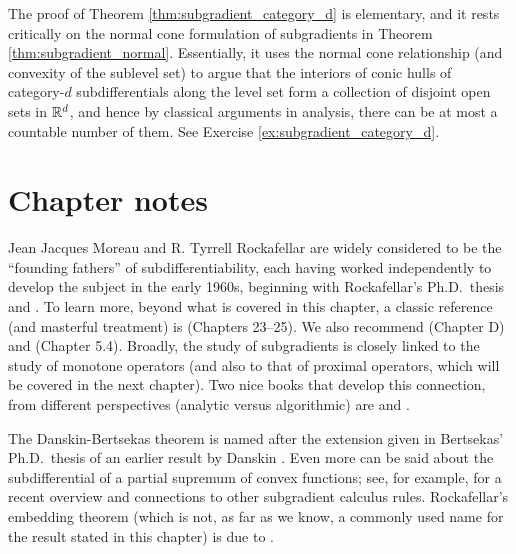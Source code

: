 
The proof of Theorem \ref{thm:subgradient_category_d} is elementary, and it
rests critically on the normal cone formulation of subgradients in Theorem 
\ref{thm:subgradient_normal}. Essentially, it uses the normal cone relationship
(and convexity of the sublevel set) to argue that the interiors of 
conic hulls of category-$d$ subdifferentials along the level set form a
collection of disjoint open sets in $\mathbb{R}^d$, and hence by classical arguments in 
analysis, there can be at most a countable number of them. See Exercise
\ref{ex:subgradient_category_d}.   

\SkipTocEntry\section*{Chapter notes}

Jean Jacques Moreau and R. Tyrrell Rockafellar are widely considered to be the
``founding fathers'' of subdifferentiability, each having worked independently
to develop the subject in the early 1960s, beginning with Rockafellar's Ph.D.\
thesis \cite{rockafellar1963convex} and \cite{moreau1963inf,
  moreau1963proprietes}. To learn more, beyond what is covered in this chapter,
a classic reference (and masterful treatment) is \cite{rockafellar1970convex}
(Chapters 23--25). We also recommend \cite{hiriartUrruty2001fundamentals}
(Chapter D) and \cite{bertsekas2009convex} (Chapter 5.4). Broadly, the study of
subgradients is closely linked to the study of monotone operators (and also to 
that of proximal operators, which will be covered in the next chapter). Two nice
books that develop this connection, from different perspectives (analytic versus 
algorithmic) are \cite{bauschke2011convex} and \cite{ryu2022large}.

The Danskin-Bertsekas theorem is named after the extension given in Bertsekas'
Ph.D.\ thesis \cite{bertsekas1971control} of an earlier result by Danskin
\cite{danskin1967theory}. Even more can be said about the subdifferential of a
partial supremum of convex functions; see, for example,
\cite{hantoute2008subdifferential} for a recent overview and connections to
other subgradient calculus rules. Rockafellar's embedding theorem (which is not, 
as far as we know, a commonly used name for the result stated in this chapter)
is due to \cite{rockafellar1966characterization}.


